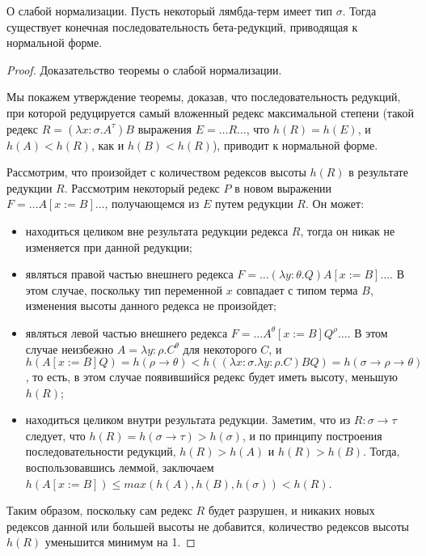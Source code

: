 \begin{theorem} О слабой нормализации. Пусть некоторый лямбда-терм имеет
тип $\sigma$. Тогда существует конечная последовательность бета-редукций,
приводящая к нормальной форме.
\end{theorem}

%

\begin{proof}Доказательство теоремы о слабой нормализации.

Мы покажем утверждение теоремы, доказав, что последовательность редукций,
при которой редуцируется самый вложенный редекс максимальной степени
(такой редекс $R = (\lambda x:\sigma.A^\tau) B$ выражения 
$E = \dots R \dots$, что $h(R) = h(E)$, и $h(A) < h(R)$, как и $h(B) < h(R)$),
приводит к нормальной форме.

Рассмотрим, что произойдет с количеством редексов высоты $h(R)$ в результате редукции 
$R$. Рассмотрим некоторый редекс $P$ в новом выражении $F = \dots A[x := B] \dots$, 
получающемся из $E$ путем редукции $R$. Он может:
\begin{itemize}
\item находиться целиком вне результата редукции редекса $R$, тогда он никак не изменяется при 
данной редукции;
\item являться правой частью внешнего редекса $F = \dots (\lambda y:\theta.Q) A[x:=B] \dots$.
В этом случае, поскольку тип переменной $x$ совпадает с типом
терма $B$, изменения высоты данного редекса не произойдет;
\item являться левой частью внешнего редекса $F = \dots A^\theta[x:=B] Q^\rho \dots$.
В этом случае неизбежно $A = \lambda y:\rho.C^\theta$ для некоторого $C$, 
и $h(A[x:=B] Q) = h(\rho\rightarrow\theta) < h((\lambda x:\sigma.\lambda y:\rho.C) B Q) =
h(\sigma\rightarrow\rho\rightarrow\theta)$, то есть, в этом случае появившийся редекс
будет иметь высоту, меньшую $h(R)$;
\item находиться целиком внутри результата редукции. Заметим, что из $R: \sigma \rightarrow \tau$ 
следует, что $h(R) = h(\sigma\rightarrow\tau) > h(\sigma)$, и по принципу построения 
последовательности редукций, $h(R) > h(A)$ и $h(R) > h(B)$.
Тогда, воспользовавшись леммой, заключаем $h(A[x:=B]) \le max(h(A),h(B),h(\sigma)) < h(R)$.
\end{itemize}
Таким образом, поскольку сам редекс $R$ будет разрушен, и никаких новых редексов данной или 
большей высоты не добавится, количество редексов высоты $h(R)$ уменьшится минимум на 1.


\end{proof}
